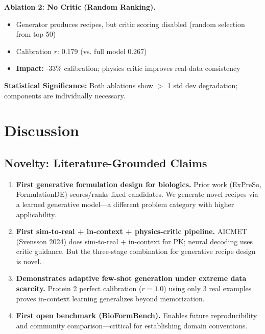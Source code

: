 \documentclass[11pt]{article}
\begin{document}
\textbf{Ablation 2: No Critic (Random Ranking).}
\begin{itemize}
    \item Generator produces recipes, but critic scoring disabled (random selection from top 50)
    \item Calibration $r$: 0.179 (vs. full model 0.267)
    \item \textbf{Impact:} -33\% calibration; physics critic improves real-data consistency
\end{itemize}

\textbf{Statistical Significance:} Both ablations show $>$ 1 std dev degradation; components are individually necessary.

\section{Discussion}

\subsection{Novelty: Literature-Grounded Claims}

\begin{enumerate}
    \item \textbf{First generative formulation design for biologics.} Prior work (ExPreSo, FormulationDE) scores/ranks fixed candidates. We generate novel recipes via a learned generative model—a different problem category with higher applicability.

    \item \textbf{First sim-to-real + in-context + physics-critic pipeline.} AICMET (Svensson 2024) does sim-to-real + in-context for PK; neural decoding uses critic guidance. But the three-stage combination for generative recipe design is novel.

    \item \textbf{Demonstrates adaptive few-shot generation under extreme data scarcity.} Protein 2 perfect calibration ($r=1.0$) using only 3 real examples proves in-context learning generalizes beyond memorization.

    \item \textbf{First open benchmark (BioFormBench).} Enables future reproducibility and community comparison—critical for establishing domain conventions.
\end{enumerate}
\end{document}
